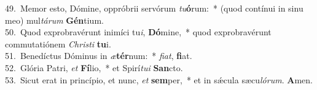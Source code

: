 {49.~}Memor esto, Dómine, oppróbrii servórum \textit{tu}\textbf{ó}rum:~* (quod contínui in sinu meo) mul\textit{tá}\textit{rum} \textbf{Gén}tium.\\
{50.~}Quod exprobravérunt inimíci tu\textit{i}, \textbf{Dó}mine,~* quod exprobravérunt commutatiónem \textit{Chri}\textit{sti} \textbf{tu}i.\\
{51.~}Benedíctus Dóminus in \textit{æ}\textbf{tér}num:~* \textit{fi}\textit{at}, \textbf{fi}at.\\
{52.~}Glória Patri, \textit{et} \textbf{Fí}lio,~* et Spirí\textit{tu}\textit{i} \textbf{San}cto.\\
{53.~}Sicut erat in princípio, et nunc, \textit{et} \textbf{sem}per,~* et in sǽcula sæcu\textit{ló}\textit{rum}. \textbf{A}men.\\
